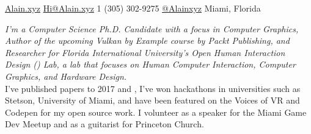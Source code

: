 \documentclass[10pt,a4paper]{article}
\begin{document}
 

\noindent \href{https://alain.xyz}{Alain.xyz} \bull \href{mailto:hi@Alain.xyz}{Hi@Alain.xyz} \bull
\textsmaller{+}1 (305) 302-9275 \bull \href{https://twitter.com/Alainxyz}{@Alainxyz} \bull Miami, Florida

\spacedhrule{0.9em}{-0.4em}



\vspace{-1.3em}

\begin{multicols}{2}
\noindent \textit{I'm a Computer Science Ph.D. Candidate with a focus in Computer Graphics, Author of the upcoming Vulkan by Example course by Packt Publishing, and Researcher for Florida International University's Open Human Interaction Design () Lab, a lab that focuses on Human Computer Interaction, Computer Graphics, and Hardware Design.} \\

I've published papers to  2017 and , I've won hackathons in universities such as Stetson, University of Miami, and have been featured on the Voices of VR and Codepen for my open source work. I volunteer as a speaker for the Miami Game Dev Meetup and as a guitarist for Princeton Church.
\end{multicols}
\end{document}
